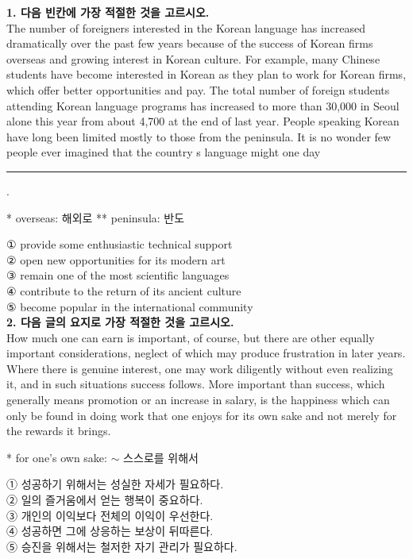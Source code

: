 \documentclass[a4paper, twocolumn]{oblivoir}
\begin{document}
    \noindent
    \textbf{1. 다음 빈칸에 가장 적절한 것을 고르시오.}\\

    The number of foreigners interested in the Korean
    language has increased dramatically over the past few
    years because of the success of Korean firms overseas
    and growing interest in Korean culture. For example,
    many Chinese students have become interested in Korean
    as they plan to work for Korean firms, which offer
    better opportunities and pay. The total number of foreign
    students attending Korean language programs has
    increased to more than 30,000 in Seoul alone this year
    from about 4,700 at the end of last year. People speaking
    Korean have long been limited mostly to those from the
    peninsula. It is no wonder few people ever imagined that
    the country s language might one day \rule{1.2cm}{0.15mm}.
    \begin{flushright}
        \small{* overseas: 해외로 ** peninsula: 반도}
    \end{flushright}

   
\noindent 
① provide some enthusiastic technical support \\
② open new opportunities for its modern art\\
③ remain one of the most scientific languages\\
④ contribute to the return of its ancient culture\\
⑤ become popular in the international community\\

    \noindent
    \textbf{2. 다음 글의 요지로 가장 적절한 것을 고르시오.}\\

    How much one can earn is important, of course, but
    there are other equally important considerations, neglect of
    which may produce frustration in later years. Where there
    is genuine interest, one may work diligently without even
    realizing it, and in such situations success follows. More
    important than success, which generally means promotion
    or an increase in salary, is the happiness which can only
    be found in doing work that one enjoys for its own sake
    and not merely for the rewards it brings.
    \begin{flushright}
        \small{* for one's own sake: $\sim $ 스스로를 위해서}
    \end{flushright}

    
    \noindent
    ① 성공하기 위해서는 성실한 자세가 필요하다.\\
② 일의 즐거움에서 얻는 행복이 중요하다.\\
③ 개인의 이익보다 전체의 이익이 우선한다.\\
④ 성공하면 그에 상응하는 보상이 뒤따른다.\\
⑤ 승진을 위해서는 철저한 자기 관리가 필요하다.\\
\end{document}
